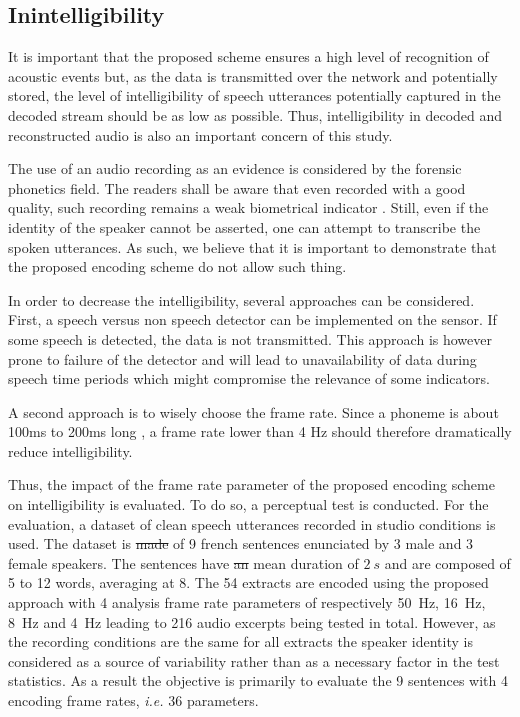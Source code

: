 \documentclass[sensors,article,submit,moreauthors,pdftex,10pt,a4paper]{mdpi}
\providecommand{\DIFaddtex}[1]{{\protect\color{blue}\uwave{#1}}} %
\providecommand{\DIFdeltex}[1]{{\protect\color{red}\sout{#1}}}                      %
\providecommand{\DIFaddbegin}{} %
\providecommand{\DIFaddend}{} %
\providecommand{\DIFdelbegin}{} %
\providecommand{\DIFdelend}{} %
\providecommand{\DIFadd}[1]{\texorpdfstring{\DIFaddtex{#1}}{#1}} %
\providecommand{\DIFdel}[1]{\texorpdfstring{\DIFdeltex{#1}}{}} %
\begin{document}
\DIFaddend \subsection{Inintelligibility} \DIFdelbegin %
\DIFdelend \DIFaddbegin \label{sec:inintelligibility_p}
\DIFaddend 

It is important that the proposed scheme ensures a high level of recognition of acoustic events but, as the data is transmitted over the network and potentially stored, the level of intelligibility of  speech utterances potentially captured in the decoded stream should be as low as possible. Thus, intelligibility in decoded and reconstructed audio is also an important concern of this study.

The use of an audio recording as an evidence is considered by the forensic phonetics \cite{baldwin1990forensic} field. The readers shall be aware that even recorded with a good quality, such recording remains a weak biometrical indicator \cite{boe2000forensic}. Still, even if the identity of the speaker cannot be asserted, one can attempt to transcribe the spoken utterances. As such, we believe that it is important to demonstrate that the proposed encoding scheme do not allow such thing.

In order to decrease the intelligibility, several approaches can be considered. First, a speech versus non speech detector can be implemented on the sensor. If some speech is detected, the data is not transmitted. This approach is however prone to failure of the detector and will lead to unavailability of data during speech time periods which might compromise the relevance of some indicators.

A second approach is to wisely choose the frame rate. Since a phoneme is about 100ms to 200ms long \cite{kuwabara1996acoustic} \cite{rosen1992temporal}, a frame rate lower than 4 Hz should therefore dramatically reduce intelligibility.

Thus, the impact of the frame rate parameter of the proposed encoding scheme on intelligibility is evaluated. To do so, a perceptual test is conducted. For the evaluation, a dataset of clean speech utterances recorded in studio conditions is used. The dataset is \DIFdelbegin \DIFdel{made }\DIFdelend \DIFaddbegin \DIFadd{composed }\DIFaddend of 9 french sentences enunciated by 3 male and 3 female speakers. The sentences have \DIFdelbegin \DIFdel{an }\DIFdelend \DIFaddbegin \DIFadd{a }\DIFaddend mean duration of $2~s$ and are composed of 5 to 12 words, averaging at 8. The 54 extracts are encoded using the proposed approach with 4 analysis frame rate parameters of respectively 50~Hz, 16~Hz, 8~Hz and 4~Hz leading to 216 audio excerpts being tested in total. However, as the recording conditions are the same for all extracts the speaker identity is considered as a source of variability rather than as a necessary factor in the test statistics. As a result the objective is primarily to evaluate the 9 sentences with 4 encoding frame rates, \textit{i.e.} 36 parameters.
\end{document}
